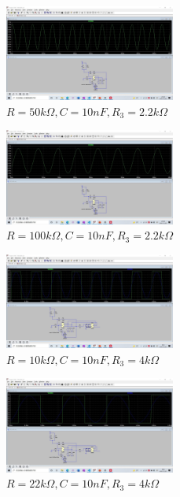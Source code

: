 \documentclass[UTF8]{ctexart}
\begin{document}
\begin{figure}[H]
        \centering
        \includegraphics[width = 0.5\textwidth]{1-1-50k-10n.jpg}
        \caption{$R = 50k \Omega, C = 10nF, R_3 = 2.2 k \Omega$}
\end{figure}

\begin{figure}[H]
        \centering
        \includegraphics[width = 0.5\textwidth]{1-1-100k-10n.jpg}
        \caption{$R = 100k \Omega, C = 10nF, R_3 = 2.2 k \Omega$}
\end{figure}

\begin{figure}[H]
        \centering
        \includegraphics[width = 0.5\textwidth]{1-1-10k-10n-4.jpg}
        \caption{$R = 10k \Omega, C = 10nF, R_3 = 4 k \Omega$}
\end{figure}

\begin{figure}[H]
        \centering
        \includegraphics[width = 0.5\textwidth]{1-1-22k-10n-4.jpg}
        \caption{$R = 22k \Omega, C = 10nF, R_3 = 4 k \Omega$}
\end{figure}
\end{document}
